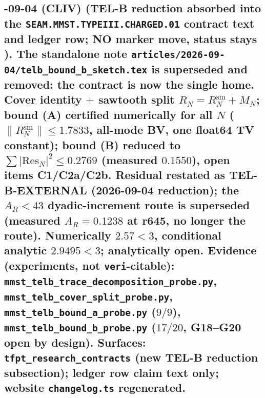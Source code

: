 \subsection*{-09-04 (CLIV) (TEL-B reduction absorbed into the \texttt{SEAM.MMST.TYPEIII.CHARGED.01} contract text and ledger row; NO marker move, status stays \mO).  The standalone note \texttt{articles/2026-09-04/telb\_bound\_b\_sketch.tex} is superseded and removed: the contract is now the single home.  Cover identity $+$ sawtooth split $R_N=R^{\mathrm{sm}}_N+M_N$; bound (A) certified numerically for all $N$ ($\lVert R^{\mathrm{sm}}_N\rVert\le1.7833$, all-mode BV, one float64 TV constant); bound (B) reduced to $\sum\lvert\mathrm{Res}_N\rvert^2\le0.2769$ (measured $0.1550$), open items C1/C2a/C2b.  Residual restated as TEL-B-EXTERNAL (2026-09-04 reduction); the $A_R<43$ dyadic-increment route is superseded (measured $A_R=0.1238$ at r645, no longer the route).  Numerically $2.57<3$, conditional analytic $2.9495<3$; analytically open.  Evidence (experiments, not \texttt{veri}-citable): \texttt{mmst\_telb\_trace\_decomposition\_probe.py}, \texttt{mmst\_telb\_cover\_split\_probe.py}, \texttt{mmst\_telb\_bound\_a\_probe.py} ($9/9$), \texttt{mmst\_telb\_bound\_b\_probe.py} ($17/20$, G18--G20 open by design).  Surfaces: \texttt{tfpt\_research\_contracts} (new TEL-B reduction subsection); ledger row claim text only; website \texttt{changelog.ts} regenerated.}
